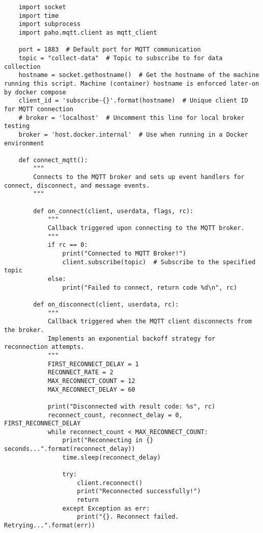 \begin{verbatim}
    import socket
    import time
    import subprocess
    import paho.mqtt.client as mqtt_client

    port = 1883  # Default port for MQTT communication
    topic = "collect-data"  # Topic to subscribe to for data collection
    hostname = socket.gethostname()  # Get the hostname of the machine running this script. Machine (container) hostname is enforced later-on by docker compose 
    client_id = 'subscribe-{}'.format(hostname)  # Unique client ID for MQTT connection
    # broker = 'localhost'  # Uncomment this line for local broker testing
    broker = 'host.docker.internal'  # Use when running in a Docker environment

    def connect_mqtt():
        """
        Connects to the MQTT broker and sets up event handlers for connect, disconnect, and message events.
        """

        def on_connect(client, userdata, flags, rc):
            """
            Callback triggered upon connecting to the MQTT broker.
            """
            if rc == 0:
                print("Connected to MQTT Broker!")
                client.subscribe(topic)  # Subscribe to the specified topic
            else:
                print("Failed to connect, return code %d\n", rc)
        
        def on_disconnect(client, userdata, rc):
            """
            Callback triggered when the MQTT client disconnects from the broker.
            Implements an exponential backoff strategy for reconnection attempts.
            """
            FIRST_RECONNECT_DELAY = 1
            RECONNECT_RATE = 2
            MAX_RECONNECT_COUNT = 12
            MAX_RECONNECT_DELAY = 60

            print("Disconnected with result code: %s", rc)
            reconnect_count, reconnect_delay = 0, FIRST_RECONNECT_DELAY
            while reconnect_count < MAX_RECONNECT_COUNT:
                print("Reconnecting in {} seconds...".format(reconnect_delay))
                time.sleep(reconnect_delay)

                try:
                    client.reconnect()
                    print("Reconnected successfully!")
                    return
                except Exception as err:
                    print("{}. Reconnect failed. Retrying...".format(err))


\end{verbatim}

